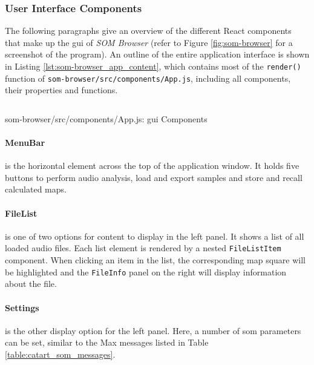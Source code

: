 \subsubsection{User Interface Components}
\label{subsubsec:som-browser_components}
The following paragraphs give an overview of the different React components
that make up the \gls{gui} of \textit{SOM Browser} (refer to Figure
\ref{fig:som-browser} for a screenshot of the program). An outline of the entire
application interface is shown in Listing \ref{lst:som-browser_app_content},
which contains most of the \texttt{render()} function of
\texttt{som-browser/src/components/App.js}, including all components, their
properties and functions.

\begin{listing}[!htb]
  \begin{mdframed}
    \inputminted[numbers=left, firstline=405, lastline=461,
    fontsize=\scriptsize]{jsx}{../dev/som-browser/src/components/App.js}
  \end{mdframed}
  \caption{som-browser/src/components/App.js:
  \gls{gui} Components}
  \label{lst:som-browser_app_content}
\end{listing}

\paragraph*{MenuBar}
\label{para:menu_bar}
is the horizontal element across the top of the application window. It holds
five buttons to perform audio analysis, load and export samples and store and
recall calculated maps.

\paragraph*{FileList}
\label{para:file_list}
is one of two options for content to display in the left panel. It shows a list
of all loaded audio files. Each list element is rendered by a nested
\texttt{FileListItem} component. When clicking an item in the list, the
corresponding map square will be highlighted and the \texttt{FileInfo}
panel on the right will display information about the file.

\paragraph*{Settings}
\label{para:settings}
is the other display option for the left panel. Here, a number of \gls{som}
parameters can be set, similar to the Max messages listed in Table
\ref{table:catart_som_messages}.

